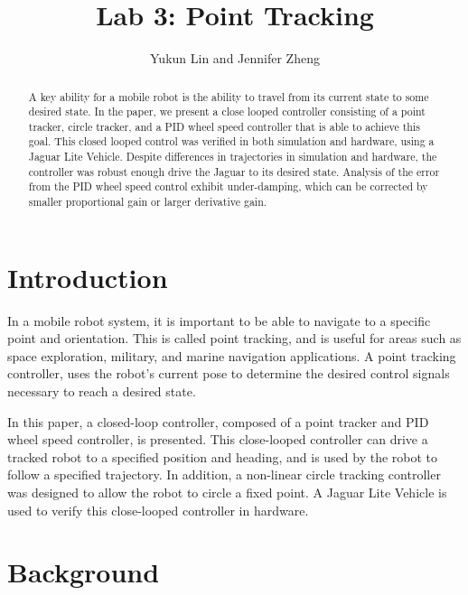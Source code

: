 \documentclass[conference]{../IEEEtran}
\begin{document}
\title{Lab 3: Point Tracking}
\author{Yukun Lin and Jennifer Zheng}
\maketitle

\begin{abstract}
A key ability for a mobile robot is the ability to travel from its current state to some desired state. In the paper, we present a close looped controller consisting of a point tracker, circle tracker, and a PID wheel speed controller that is able to achieve this goal. This closed looped control was verified in both simulation and hardware, using a Jaguar Lite Vehicle. Despite differences in trajectories in simulation and hardware, the controller was robust enough drive the Jaguar to its desired state. Analysis of the error from the PID wheel speed control exhibit
under-damping, which can be corrected by smaller proportional gain or larger derivative gain.
\end{abstract}


\section{Introduction}
In a mobile robot system, it is important to be able to navigate to a specific point and
orientation. This is called point tracking, and is useful for areas such as space
exploration, military, and marine navigation applications. A point tracking controller,
uses the robot's current pose to determine the desired control signals necessary to reach
a desired state.

In this paper, a closed-loop controller, composed of a point tracker and PID wheel speed
controller, is presented. This close-looped controller can drive a tracked robot to a
specified position and heading, and is used by the robot to follow a specified trajectory.
In addition, a non-linear circle tracking controller was designed to allow the robot to
circle a fixed point.  A Jaguar Lite Vehicle is used to verify this close-looped
controller in hardware.

\section{Background}
\end{document}
